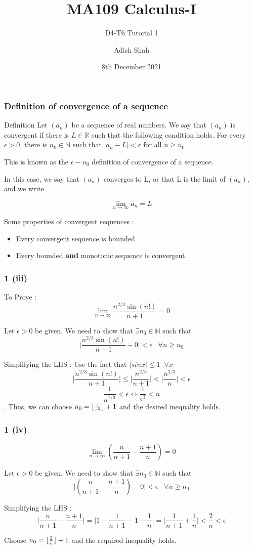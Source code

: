 \documentclass{beamer}
\title[MA109 Calculus-I] %
{MA109 Calculus-I}
\subtitle{D4-T6 Tutorial 1}
\author[Adish Shah] %
{Adish Shah}
\date[8th December 2021] %
{8th December 2021}
\DeclarePairedDelimiter\floor{\lfloor}{\rfloor}
\begin{document}
\frame{\titlepage}


\begin{frame}
  \frametitle{Definition of convergence of a sequence}
  \begin{block}{Definition}
    Let $(a_{n})$ be a sequence of real numbers. We say that $(a_{n})$ is convergent if there is $L \in \mathbb{R}$ such that
    the following condition holds. For every $\epsilon > 0 $, there is $n_{0} \in \mathbb{N}$ such that 
    $|a_{n}-L| < \epsilon $ for all $n \ge n_{0}$.
  \end{block}  
  This is known as the $\epsilon - n_{0}$ definition of convergence of a sequence.

  In this case, we say that $(a_{n})$ converges to L, or that L is the limit of $(a_{n})$, and we write

  \[\lim_{n \rightarrow \infty} a_{n} = L \]

  Some properties of convergent sequences :
  \begin{itemize}
    \item<1-> Every convergent sequence is bounded.
    \item<2-> Every bounded \textbf{and} monotonic sequence is convergent.
  \end{itemize}
\end{frame}

\begin{frame}
\frametitle{1 (iii)}

To Prove : \[\lim_{n \rightarrow \infty} \frac{n^{2/3}\sin(n!)}{n+1} = 0 \] \pause

Let $\epsilon > 0$ be given. We need to show that \( \exists n_{0} \in \mathbb{N}\) such that 
\[\bigg |\frac{n^{2/3}\sin(n!)}{n+1} - 0 \bigg | < \epsilon \; \; \; \forall n \ge n_{0}\] \pause

Simplifying the LHS : 
Use the fact that \(|sinx| \le 1 \; \; \forall x\)
\[\bigg |\frac{n^{2/3}\sin(n!)}{n+1} \bigg | \le \bigg |\frac{n^{2/3}}{n+1} \bigg | < \bigg |\frac{n^{2/3}}{n} \bigg | < \epsilon\] \pause
\[ \frac{1}{n^{1/3}} < \epsilon  \iff \frac{1}{\epsilon^{3}} < n \]. \pause
Thus, we can choose $n_{0} = \floor{\frac{1}{\epsilon^{3}}} +1 $ and the desired inequality holds.

\end{frame}


\begin{frame}
    \frametitle{1 (iv)}

    \[\lim_{n \rightarrow \infty} \left(\frac{n}{n+1} - \frac{n+1}{n}\right)  = 0\] \pause

    Let $\epsilon > 0$ be given. We need to show that \( \exists n_{0} \in \mathbb{N}\) such that 
    \[\bigg |\left(\frac{n}{n+1} - \frac{n+1}{n}\right) - 0 \bigg | < \epsilon \; \; \; \forall n \ge n_{0}\]\pause

    Simplifying the LHS : 
    \[\bigg |\frac{n}{n+1} - \frac{n+1}{n} \bigg | = \bigg |1 - \frac{1}{n+1} - 1 - \frac{1}{n} \bigg | = \bigg |\frac{1}{n+1} + \frac{1}{n} \bigg | < \frac{2}{n} < \epsilon\] \pause
    
    Choose $n_{0} = \floor{\frac{2}{\epsilon}} + 1$ and the required inequality holds.
\end{frame}
\end{document}
